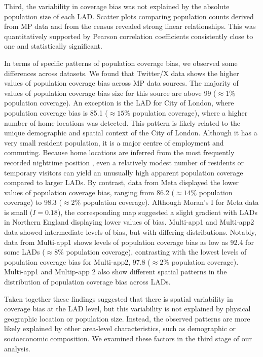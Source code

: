 \documentclass[]{rsos}%
\begin{document}
Third, the variability in coverage bias was not explained by the
absolute population size of each LAD. Scatter plots comparing population
counts derived from MP data and from the census revealed strong linear
relationships. This was quantitatively supported by Pearson correlation
coefficients consistently close to one and statistically significant.

In terms of specific patterns of population coverage bias, we observed
some differences across datasets. We found that Twitter/X data shows the
higher values of population coverage bias across MP data sources. The
majority of values of population coverage bias size for this source are
above 99 (\(\approx 1 \%\) population coverage). An exception is the LAD
for City of London, where population coverage bias is 85.1
(\(\approx 15 \%\) population coverage), where a higher number of home
locations was detected. This pattern is likely related to the unique
demographic and spatial context of the City of London. Although it has a
very small resident population, it is a major centre of employment and
commuting. Because home locations are inferred from the most frequently
recorded nighttime position \citep{wang2022}, even a relatively modest number
of residents or temporary visitors can yield an unusually high apparent
population coverage compared to larger LADs. By contrast, data from Meta
displayed the lower values of population coverage bias, ranging from
86.2 (\(\approx 14 \%\) population coverage) to 98.3 (\(\approx 2 \%\)
population coverage). Although Moran's I for Meta data is small
(\(I = 0.18\)), the corresponding map suggested a slight gradient with
LADs in Northern England displaying lower values of bias. Multi-app1 and
Multi-app2 data showed intermediate levels of bias, but with differing
distributions. Notably, data from Multi-app1 shows levels of population
coverage bias as low as 92.4 for some LADs (\(\approx 8 \%\) population
coverage), contrasting with the lowest levels of population coverage
bias for Multi-app2, 97.8 (\(\approx 2\%\) population coverage).
Multi-app1 and Multip-app 2 also show different spatial patterns in the
distribution of population coverage bias across LADs.

Taken together these findings suggested that there is spatial
variability in coverage bias at the LAD level, but this variability is
not explained by physical geographic location or population size.
Instead, the observed patterns are more likely explained by other
area-level characteristics, such as demographic or socioeconomic
composition. We examined these factors in the third stage of our
analysis.
\end{document}

